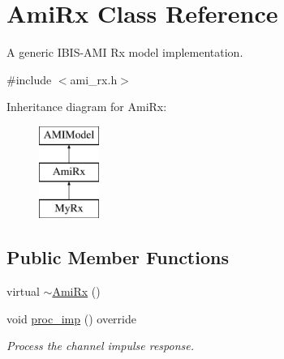 \hypertarget{class_ami_rx}{}\section{Ami\+Rx Class Reference}
\label{class_ami_rx}


A generic I\+B\+I\+S-\/\+A\+M\+I Rx model implementation.  




{\ttfamily \#include $<$ami\+\_\+rx.\+h$>$}

Inheritance diagram for Ami\+Rx\+:\begin{figure}[H]
\begin{center}
\leavevmode
\includegraphics[height=3.000000cm]{class_ami_rx}
\end{center}
\end{figure}
\subsection*{Public Member Functions}
\begin{DoxyCompactItemize}
\item 
virtual \hyperlink{class_ami_rx_a93d8a169660a911021566682e02da75f}{$\sim$\+Ami\+Rx} ()
\item 
void \hyperlink{class_ami_rx_a74a1a6c1ac9a46634cb0d0ab56b83c4e}{proc\+\_\+imp} () override
\begin{DoxyCompactList}\small\item\em Process the channel impulse response. \end{DoxyCompactList}\end{DoxyCompactItemize}
